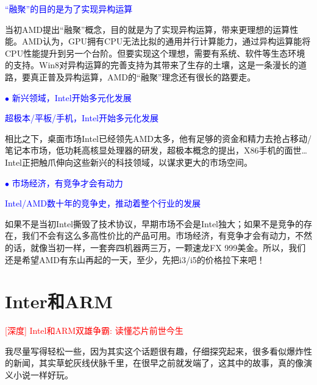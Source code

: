 \documentclass[utf8]{book}
\begin{document}
	\begin{flushleft}
		{\large \textcolor{blue}{“融聚”的目的是为了实现异构运算}}
	\end{flushleft}
	
	当初AMD提出“融聚”概念，目的就是为了实现异构运算，带来更理想的运算性能。AMD认为，GPU拥有CPU无法比拟的通用并行计算能力，通过异构运算能将CPU性能提升到另一个台阶。但要实现这个理想，需要有系统、软件等生态环境的支持。Win8对异构运算的完善支持为其带来了生存的土壤，这是一条漫长的道路，要真正普及异构运算，AMD的“融聚”理念还有很长的路要走。
	
	\begin{flushleft}
		{\large \textcolor{blue}{$\bullet$ 新兴领域，Intel开始多元化发展}}
	\end{flushleft}

	
	\begin{flushleft}
		{\large \textcolor{blue}{超极本/平板/手机，Intel开始多元化发展}}
	\end{flushleft}

	相比之下，桌面市场Intel已经领先AMD太多，他有足够的资金和精力去抢占移动/笔记本市场，低功耗高核显处理器的研发，超极本概念的提出，X86手机的面世… Intel正把触爪伸向这些新兴的科技领域，以谋求更大的市场空间。
	
	\begin{flushleft}
		{\large \textcolor{blue}{$\bullet$ 市场经济，有竞争才会有动力}}
	\end{flushleft}
	
	\begin{flushleft}
		{\large \textcolor{blue}{Intel/AMD数十年的竞争史，推动着整个行业的发展}}
	\end{flushleft}

	如果不是当初Intel撕毁了技术协议，早期市场不会是Intel独大；如果不是竞争的存在，我们不会有这么多高性价比的产品可用。市场经济，有竞争才会有动力，不然的话，就像当初一样，一套奔四机器两三万，一颗速龙FX 999美金。所以，我们还是希望AMD有东山再起的一天，至少，先把i3/i5的价格拉下来吧！
	
	\section{Inter和ARM}
	
	\begin{center}
		{\normalsize \textcolor{red}{[深度] Intel和ARM双雄争霸: 读懂芯片前世今生}}
	\end{center}
	
	
	我尽量写得轻松一些，因为其实这个话题很有趣，仔细探究起来，很多看似爆炸性的新闻，其实草蛇灰线伏脉千里，在很早之前就发端了，这其中的故事，真的像演义小说一样好玩。
	
\end{document}

